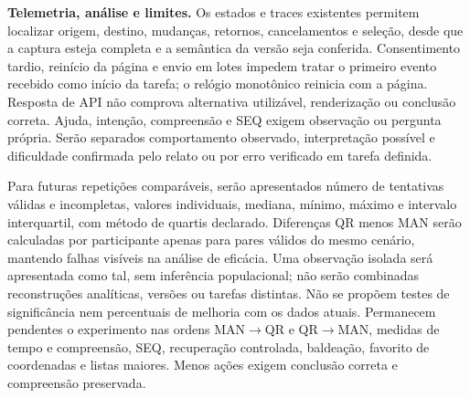\textbf{Telemetria, análise e limites.} Os estados e traces existentes permitem localizar origem, destino, mudanças, retornos, cancelamentos e seleção, desde que a captura esteja completa e a semântica da versão seja conferida. Consentimento tardio, reinício da página e envio em lotes impedem tratar o primeiro evento recebido como início da tarefa; o relógio monotônico reinicia com a página. Resposta de API não comprova alternativa utilizável, renderização ou conclusão correta. Ajuda, intenção, compreensão e SEQ exigem observação ou pergunta própria. Serão separados comportamento observado, interpretação possível e dificuldade confirmada pelo relato ou por erro verificado em tarefa definida.

Para futuras repetições comparáveis, serão apresentados número de tentativas válidas e incompletas, valores individuais, mediana, mínimo, máximo e intervalo interquartil, com método de quartis declarado. Diferenças QR menos MAN serão calculadas por participante apenas para pares válidos do mesmo cenário, mantendo falhas visíveis na análise de eficácia. Uma observação isolada será apresentada como tal, sem inferência populacional; não serão combinadas reconstruções analíticas, versões ou tarefas distintas. Não se propõem testes de significância nem percentuais de melhoria com os dados atuais. Permanecem pendentes o experimento nas ordens MAN$\rightarrow$QR e QR$\rightarrow$MAN, medidas de tempo e compreensão, SEQ, recuperação controlada, baldeação, favorito de coordenadas e listas maiores. Menos ações exigem conclusão correta e compreensão preservada.
